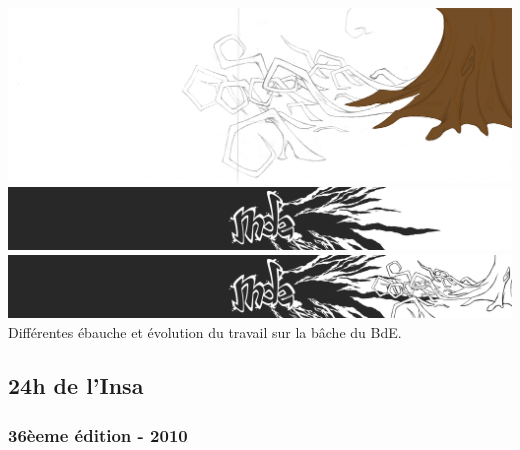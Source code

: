         \begin{center}
            \includegraphics[width=\textwidth]{img/arbre.png}
            \includegraphics[width=\textwidth]{img/mde.png}
            \includegraphics[width=\textwidth]{img/mde+arbre.png}
            Différentes ébauche et évolution du travail sur la bâche du BdE.
        \end{center}
            
    \subsection{24h de l'Insa}
    
        \subsubsection{36èeme édition - 2010}
    
